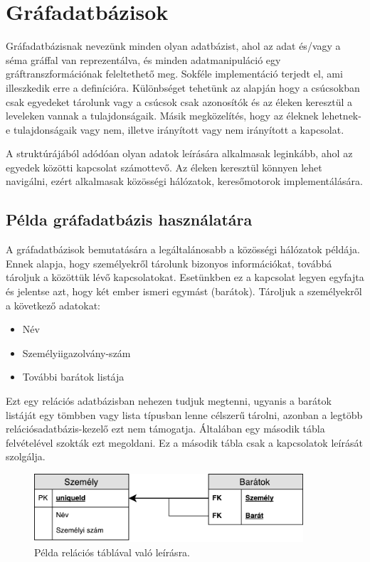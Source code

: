 \chapter{Gráfadatbázisok}

Gráfadatbázisnak nevezünk minden olyan adatbázist, ahol az adat és/vagy a séma gráffal van reprezentálva, és minden adatmanipuláció egy gráftranszformációnak feleltethető meg\cite{angles2008survey}. Sokféle implementáció terjedt el, ami illeszkedik erre a definícióra. Különbséget tehetünk az alapján hogy a csúcsokban csak egyedeket tárolunk vagy a csúcsok csak azonosítók és az éleken keresztül a leveleken vannak a tulajdonságaik. Másik megközelítés, hogy az éleknek lehetnek-e tulajdonságaik vagy nem, illetve irányított vagy nem irányított a kapcsolat. 

A struktúrájából adódóan olyan adatok leírására alkalmasak leginkább, ahol az egyedek közötti kapcsolat számottevő\cite{Neo4JGraphDatabase}. Az éleken keresztül könnyen lehet navigálni, ezért alkalmasak közösségi hálózatok, keresőmotorok implementálására. 

\section{Példa gráfadatbázis használatára}

A gráfadatbázisok bemutatására a legáltalánosabb a közösségi hálózatok példája. Ennek alapja, hogy személyekről tárolunk bizonyos információkat, továbbá tároljuk a közöttük lévő kapcsolatokat. Esetünkben ez a kapcsolat legyen egyfajta és jelentse azt, hogy két ember ismeri egymást (barátok). Tároljuk a személyekről a következő adatokat:
\begin{itemize}
	\item Név
	\item Személyiigazolvány-szám
	\item További barátok listája
\end{itemize} 
Ezt egy relációs adatbázisban nehezen tudjuk megtenni, ugyanis a barátok listáját egy tömbben vagy lista típusban lenne célszerű tárolni, azonban a legtöbb relációsadatbázis-kezelő ezt nem támogatja. Általában egy második tábla felvételével szokták ezt megoldani. Ez a második tábla csak a kapcsolatok leírását szolgálja.

\begin{figure}[H]
	\centering
	\includegraphics[width=100mm]{figures/RelaciosPelda.pdf}
	\caption{Példa relációs táblával való leírásra.}
	\label{fig:relaciosPelda}
\end{figure}

